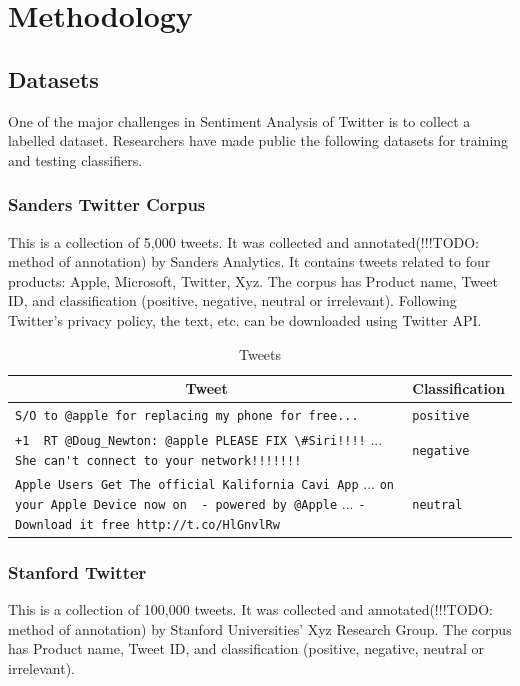 \section{Methodology}

\subsection{Datasets}
One of the major challenges in Sentiment Analysis of Twitter is to collect a labelled dataset.
Researchers have made public the following datasets for training and testing classifiers.

\subsubsection{Sanders Twitter Corpus}
This is a collection of 5,000 tweets. It was collected and annotated(!!!TODO: method of annotation) by Sanders Analytics.
It contains tweets related to four products: Apple, Microsoft, Twitter, Xyz.
The corpus has Product name, Tweet ID, and classification (positive, negative, neutral or irrelevant).
Following Twitter's privacy policy, the text, etc. can be downloaded using Twitter API.

\begin{table}[h]
\centering
	\begin{tabular}{| p{} | l | }

	\hline
		\multicolumn{1}{|c|}{Tweet} &
		\multicolumn{1}{|c|}{Classification} \\
	\hline
	\verb'S/O to @apple for replacing my phone for free...' &  \verb'positive' \\ \hline
	\verb"+1  RT @Doug_Newton: @apple PLEASE FIX \#Siri!!!!" {...}
	\verb"She can't connect to your network!!!!!!!" &  \verb'negative' \\ \hline
	\verb'Apple Users Get The official Kalifornia Cavi App' {...}
	\verb'on your Apple Device now on  - powered by @Apple' {...}
	\verb'- Download it free http://t.co/HlGnvlRw' &  \verb'neutral' \\ \hline

	\end{tabular}
\caption{Tweets}
\label{table:twt}
\end{table}

\subsubsection{Stanford Twitter}
This is a collection of 100,000 tweets. It was collected and annotated(!!!TODO: method of annotation)
by Stanford Universities' Xyz Research Group.
The corpus has Product name, Tweet ID, and classification (positive, negative, neutral or irrelevant).

